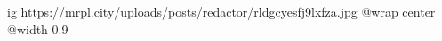  
 
 
 
 

\ifcmt
  ig https://mrpl.city/uploads/posts/redactor/rldgcyesfj9lxfza.jpg
  @wrap center
  @width 0.9
\fi
